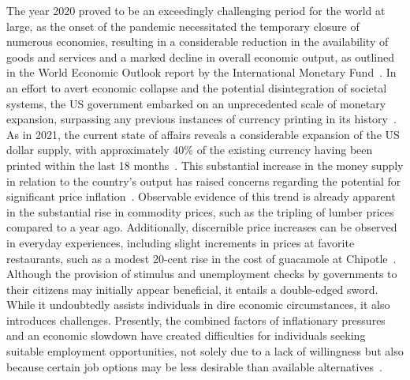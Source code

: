 The year 2020 proved to be an exceedingly challenging period for the world at large, as the onset of the pandemic necessitated the temporary
closure of numerous economies, resulting in a considerable reduction in the availability of goods and services and a marked decline in overall
economic output, as outlined in the World Economic Outlook report by the International Monetary Fund~\cite{imf2020}. In an effort to avert
economic collapse and the potential disintegration of societal systems, the US government embarked on an unprecedented scale of monetary
expansion, surpassing any previous instances of currency printing in its history~\cite{blinder2020}. As in 2021, the current state of affairs
reveals a considerable expansion of the US dollar supply, with approximately 40\% of the existing currency having been printed within the last
18 months~\cite{fedmoneysupply}. This substantial increase in the money supply in relation to the country's output has raised concerns regarding
the potential for significant price inflation~\cite{Blanchard2021}. Observable evidence of this trend is already apparent in the substantial
rise in commodity prices, such as the tripling of lumber prices compared to a year ago. Additionally, discernible price increases can be
observed in everyday experiences, including slight increments in prices at favorite restaurants, such as a modest 20-cent rise in the cost of
guacamole at Chipotle~\cite{BLS}. Although the provision of stimulus and unemployment checks by governments to their citizens may initially
appear beneficial, it entails a double-edged sword. While it undoubtedly assists individuals in dire economic circumstances, it also introduces
challenges. Presently, the combined factors of inflationary pressures and an economic slowdown have created difficulties for individuals seeking
suitable employment opportunities, not solely due to a lack of willingness but also because certain job options may be less desirable than
available alternatives~\cite{cbo2020, kahn2020}.

